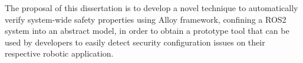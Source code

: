 
The proposal of this dissertation is to develop a novel technique to automatically verify system-wide safety properties using Alloy framework, confining a ROS2 system into an abstract model, in order to obtain a prototype tool that can be used by developers to easily detect security configuration issues on their respective robotic application.





